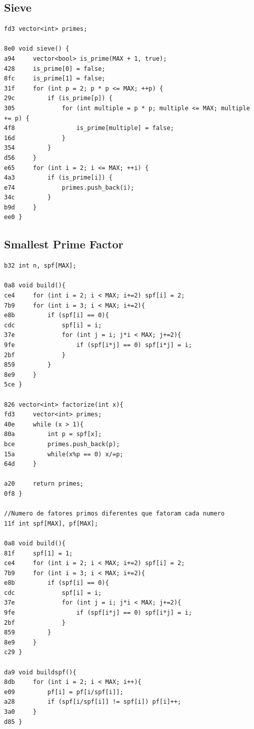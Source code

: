 \documentclass[11pt, a4paper, twoside]{article}
\begin{document}
\subsection{Sieve}
\begin{lstlisting}
fd3 vector<int> primes;

8e0 void sieve() {
a94     vector<bool> is_prime(MAX + 1, true);
428     is_prime[0] = false;
8fc     is_prime[1] = false;
31f     for (int p = 2; p * p <= MAX; ++p) {
29c         if (is_prime[p]) {
305             for (int multiple = p * p; multiple <= MAX; multiple += p) {
4f8                 is_prime[multiple] = false;
16d             }
354         }
d56     }
e65     for (int i = 2; i <= MAX; ++i) {
4a3         if (is_prime[i]) {
e74             primes.push_back(i);
34c         }
b9d     }
ee0 }
\end{lstlisting}

\subsection{Smallest Prime Factor}
\begin{lstlisting}
b32 int n, spf[MAX];

0a8 void build(){
ce4     for (int i = 2; i < MAX; i+=2) spf[i] = 2;
7b9     for (int i = 3; i < MAX; i+=2){
e8b         if (spf[i] == 0){
cdc             spf[i] = i;
37e             for (int j = i; j*i < MAX; j+=2){
9fe                 if (spf[i*j] == 0) spf[i*j] = i;
2bf             }
859         }
8e9     }
5ce }

826 vector<int> factorize(int x){
fd3     vector<int> primes;
40e     while (x > 1){
80a         int p = spf[x];
bce         primes.push_back(p);
15a         while(x%p == 0) x/=p;
64d     }
        
a20     return primes;
0f8 }

//Numero de fatores primos diferentes que fatoram cada numero
11f int spf[MAX], pf[MAX];

0a8 void build(){
81f     spf[1] = 1;
ce4     for (int i = 2; i < MAX; i+=2) spf[i] = 2;
7b9     for (int i = 3; i < MAX; i+=2){
e8b         if (spf[i] == 0){
cdc             spf[i] = i;
37e             for (int j = i; j*i < MAX; j+=2){
9fe                 if (spf[i*j] == 0) spf[i*j] = i;
2bf             }
859         }
8e9     }
c29 }

da9 void buildspf(){
8db     for (int i = 2; i < MAX; i++){
e09         pf[i] = pf[i/spf[i]];
a28         if (spf[i/spf[i]] != spf[i]) pf[i]++;
3a0     } 
d85 }
\end{lstlisting}
\end{document}
